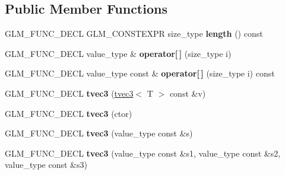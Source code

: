 \subsection*{Public Member Functions}
\begin{DoxyCompactItemize}
\item 
\hypertarget{structglm_1_1detail_1_1tvec3_a1812bf851054fe2281b0378eea31ff95}{}G\+L\+M\+\_\+\+F\+U\+N\+C\+\_\+\+D\+E\+C\+L G\+L\+M\+\_\+\+C\+O\+N\+S\+T\+E\+X\+P\+R size\+\_\+type {\bfseries length} () const \label{structglm_1_1detail_1_1tvec3_a1812bf851054fe2281b0378eea31ff95}

\item 
\hypertarget{structglm_1_1detail_1_1tvec3_a7bed745d0ba3d0b45a2166d13102ca3e}{}G\+L\+M\+\_\+\+F\+U\+N\+C\+\_\+\+D\+E\+C\+L value\+\_\+type \& {\bfseries operator\mbox{[}$\,$\mbox{]}} (size\+\_\+type i)\label{structglm_1_1detail_1_1tvec3_a7bed745d0ba3d0b45a2166d13102ca3e}

\item 
\hypertarget{structglm_1_1detail_1_1tvec3_a023498363ed653747f9b6a6f8079f7fe}{}G\+L\+M\+\_\+\+F\+U\+N\+C\+\_\+\+D\+E\+C\+L value\+\_\+type const \& {\bfseries operator\mbox{[}$\,$\mbox{]}} (size\+\_\+type i) const \label{structglm_1_1detail_1_1tvec3_a023498363ed653747f9b6a6f8079f7fe}

\item 
\hypertarget{structglm_1_1detail_1_1tvec3_afb5691185de8b87cd4fd5aa34bd9969f}{}G\+L\+M\+\_\+\+F\+U\+N\+C\+\_\+\+D\+E\+C\+L {\bfseries tvec3} (\hyperlink{structglm_1_1detail_1_1tvec3}{tvec3}$<$ T $>$ const \&v)\label{structglm_1_1detail_1_1tvec3_afb5691185de8b87cd4fd5aa34bd9969f}

\item 
\hypertarget{structglm_1_1detail_1_1tvec3_aef556e22396e99fc3b81bca6fd15f594}{}G\+L\+M\+\_\+\+F\+U\+N\+C\+\_\+\+D\+E\+C\+L {\bfseries tvec3} (ctor)\label{structglm_1_1detail_1_1tvec3_aef556e22396e99fc3b81bca6fd15f594}

\item 
\hypertarget{structglm_1_1detail_1_1tvec3_a67da3dd23a3f23f72504bcbfc6f25453}{}G\+L\+M\+\_\+\+F\+U\+N\+C\+\_\+\+D\+E\+C\+L {\bfseries tvec3} (value\+\_\+type const \&s)\label{structglm_1_1detail_1_1tvec3_a67da3dd23a3f23f72504bcbfc6f25453}

\item 
\hypertarget{structglm_1_1detail_1_1tvec3_ae0f58f899d4f07e316ec2f7fb936e4eb}{}G\+L\+M\+\_\+\+F\+U\+N\+C\+\_\+\+D\+E\+C\+L {\bfseries tvec3} (value\+\_\+type const \&s1, value\+\_\+type const \&s2, value\+\_\+type const \&s3)\label{structglm_1_1detail_1_1tvec3_ae0f58f899d4f07e316ec2f7fb936e4eb}


\end{DoxyCompactItemize}
